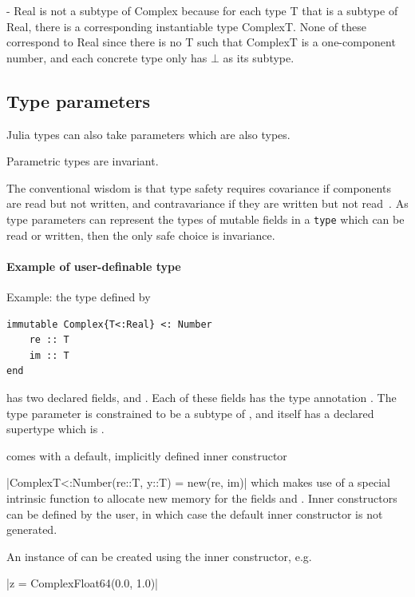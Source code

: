\documentclass[pldi]{sigplanconf-pldi15}
\begin{document}
- Real is not a subtype of Complex because for each type T that is a subtype of
Real, there is a corresponding instantiable type Complex{T}. None of these
correspond to Real since there is no T such that Complex{T} is a one-component
number, and each concrete type only has $\bot$ as its subtype.  


\subsection{Type parameters}

Julia types can also take parameters which are also types. 

Parametric types are invariant.

The conventional wisdom is that type safety requires covariance if components
are read but not written, and contravariance if they are written but not
read~\cite{Castagna1995}. As type parameters can represent the types of mutable
fields in a \verb|type| which can be read or written, then the only safe choice
is invariance.

\paragraph{Example of user-definable type}

Example: the  type defined by

\begin{verbatim}
immutable Complex{T<:Real} <: Number
    re :: T
    im :: T
end
\end{verbatim}

has two declared fields,  and . Each of these fields has the
type annotation . The type parameter  is constrained to be a
subtype of , and  itself has a declared supertype
which is .

 comes with a default, implicitly defined inner constructor

|Complex{T<:Number}(re::T, y::T) = new(re, im)|
%
which makes use of a special intrinsic function  to allocate new
memory for the fields  and . Inner constructors can be
defined by the user, in which case the default inner constructor is not
generated.

An instance of  can be created using the inner constructor, e.g.\

|z = Complex{Float64}(0.0, 1.0)|
\end{document}
